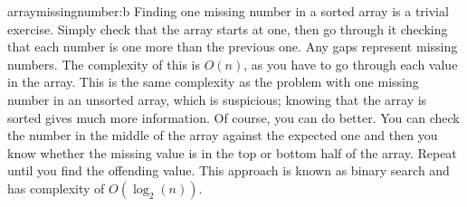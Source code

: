 \begin{subanswer}{arraymissingnumber:b}
Finding one missing number in a sorted array is a trivial exercise.
Simply check that the array starts at one, then go through it checking that each number is one more than the previous one.
Any gaps represent missing numbers.
The complexity of this is $O(n)$, as you have to go through each value in the array.
This is the same complexity as the problem with one missing number in an unsorted array, which is suspicious; knowing that the array is sorted gives much more information.
Of course, you can do better.
You can check the number in the middle of the array against the expected one and then you know whether the missing value is in the top or bottom half of the array.
Repeat until you find the offending value.
This approach is known as binary search and has complexity of $O(\log_2(n))$.
\end{subanswer}
